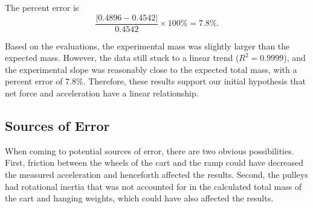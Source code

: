 \documentclass[11pt,twocolumn]{article}
\begin{document}
The percent error is
\[
\frac{|0.4896-0.4542|}{0.4542}\times100\%=\boxed{7.8\%}.
\]

Based on the evaluations, the experimental mass was slightly larger than the expected mass. However, the data still stuck to a linear trend ($R^2=0.9999$), and the experimental slope was reasonably close to the expected total mass, with a percent error of 7.8\%. Therefore, these results support our initial hypothesis that net force and acceleration have a linear relationship.

\subsection{Sources of Error}

When coming to potential sources of error, there are two obvious possibilities. First, friction between the wheels of the cart and the ramp could have decreased the measured acceleration and henceforth affected the results. Second, the pulleys had rotational inertia that was not accounted for in the calculated total mass of the cart and hanging weights, which could have also affected the results.
\end{document}
